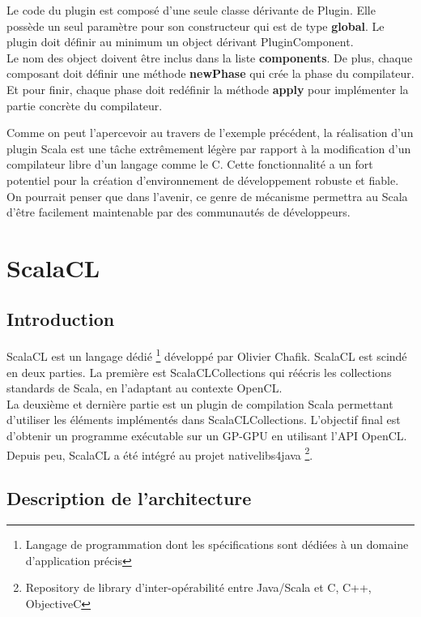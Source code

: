 \documentclass[a4paper,11pt]{report}
\begin{document}
{{\normalsize{
Le code du plugin est composé d'une seule classe dérivante de Plugin. Elle possède un seul paramètre pour son constructeur qui est de type {\bf global}. Le plugin doit définir au minimum un object dérivant PluginComponent.\\

 Le nom des object doivent être inclus dans la liste {\bf components}. De plus, chaque composant doit définir une méthode {\bf newPhase} qui crée la phase du compilateur. Et pour finir, chaque phase doit redéfinir la méthode {\bf apply} pour implémenter la partie concrète du compilateur.\\
}

\normalsize{
Comme on peut l'apercevoir au travers de l'exemple précédent, la réalisation d'un plugin Scala est une tâche extrêmement légère par rapport à la modification d'un compilateur libre d'un langage comme le C. Cette fonctionnalité a un fort potentiel pour la création d'environnement de développement robuste et fiable. On pourrait penser que dans l'avenir, ce genre de mécanisme permettra au Scala d'être facilement maintenable par des communautés de développeurs.
}

\chapter{ScalaCL}

\section{Introduction}
\vspace{6mm}
\normalsize{
ScalaCL est un langage dédié \footnote{ Langage de programmation dont les spécifications sont dédiées à un domaine d'application précis} développé par Olivier Chafik. ScalaCL est scindé en deux parties. La première est ScalaCLCollections qui réécris les collections standards de Scala, en l'adaptant au contexte OpenCL.\\

 La deuxième et dernière partie est un plugin de compilation Scala permettant d'utiliser les éléments implémentés dans ScalaCLCollections. L'objectif final est d'obtenir un programme exécutable sur un GP-GPU en utilisant l'API OpenCL. Depuis peu, ScalaCL a été intégré au projet nativelibs4java \footnote{Repository de library d'inter-opérabilité entre Java/Scala et C, C++, ObjectiveC}.
}

\section{Description de l'architecture}

}}
\end{document}
